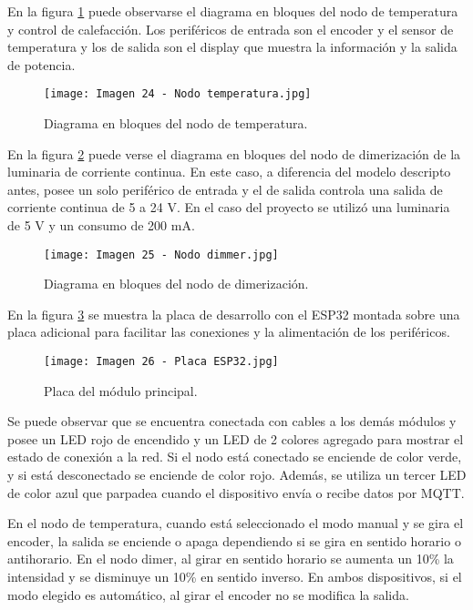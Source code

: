 En la figura \ref{fig:24} puede observarse el diagrama en bloques del nodo de temperatura y control de calefacción. Los periféricos de entrada son el encoder y el sensor de temperatura y los de salida son el display que muestra la información y la salida de potencia.

\begin{figure}[h]
\centering
\texttt{[image: Imagen 24 - Nodo temperatura.jpg]}
\caption[Nodo de temperatura]{Diagrama en bloques del nodo de temperatura.}
\label{fig:24}
\end{figure}

En la figura \ref{fig:25} puede verse el diagrama en bloques del nodo de dimerización de la luminaria de corriente continua. En este caso, a diferencia del modelo descripto antes, posee un solo periférico de entrada y el de salida controla una salida de corriente continua de 5 a 24 V. En el caso del proyecto se utilizó una luminaria de 5 V y un consumo de 200 mA.

\begin{figure}[h]
\centering
\texttt{[image: Imagen 25 - Nodo dimmer.jpg]}
\caption[Nodo dimer]{Diagrama en bloques del nodo de dimerización.}
\label{fig:25}
\end{figure}

En la figura \ref{fig:26} se muestra la placa de desarrollo con el ESP32 montada sobre una placa adicional para facilitar las conexiones y la alimentación de los periféricos. 

\begin{figure}[h]
\centering
\texttt{[image: Imagen 26 - Placa ESP32.jpg]}
\caption[Módulo principal]{Placa del módulo principal.}
\label{fig:26}
\end{figure}

Se puede observar que se encuentra conectada con cables a los demás módulos y posee un LED rojo de encendido y un LED de 2 colores agregado para mostrar el estado de conexión a la red. Si el nodo está conectado se enciende de color verde, y si está desconectado se enciende de color rojo. Además, se utiliza un tercer LED de color azul que parpadea cuando el dispositivo envía o recibe datos por MQTT.

En el nodo de temperatura, cuando está seleccionado el modo manual y se gira el encoder, la salida se enciende o apaga dependiendo si se gira en sentido horario o antihorario. En el nodo dimer, al girar en sentido horario se aumenta un 10\% la intensidad y se disminuye un 10\% en sentido inverso. En ambos dispositivos, si el modo elegido es automático, al girar el encoder no se modifica la salida.

